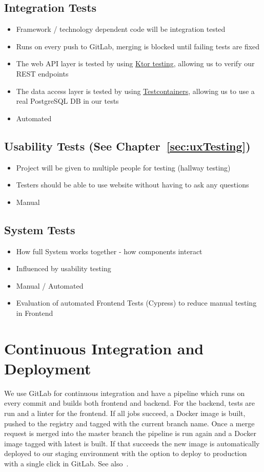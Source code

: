 \subsection{Integration Tests}
\begin{itemize}
    \item Framework / technology dependent code will be integration tested
    \item Runs on every push to GitLab, merging is blocked until failing tests are fixed
    \item The web API layer is tested by using \hyperlink{https://ktor.io/docs/testing.html}{Ktor testing}, allowing us to verify our REST endpoints
    \item The data access layer is tested by using \hyperlink{https://www.testcontainers.org/}{Testcontainers}, allowing us to use a real PostgreSQL DB in our tests
    \item Automated
\end{itemize}

\subsection{Usability Tests (See Chapter~\ref{sec:uxTesting})}
\begin{itemize}
    \item Project will be given to multiple people for testing (hallway testing)
    \item Testers should be able to use website without having to ask any questions
    \item Manual
\end{itemize}

\subsection{System Tests}
\begin{itemize}
    \item How full System works together - how components interact
    \item Influenced by usability testing
    \item Manual / Automated
    \item Evaluation of automated Frontend Tests (Cypress) to reduce manual testing in Frontend
\end{itemize}

\section{Continuous Integration and Deployment}
We use GitLab for continuous integration and have a pipeline which runs on every commit and builds both frontend and backend.
For the backend, tests are run and a linter for the frontend.
If all jobs succeed, a Docker image is built, pushed to the registry and tagged with the current branch name.
Once a merge request is merged into the master branch the pipeline is run again and a Docker image tagged with latest is built.
If that succeeds the new image is automatically deployed to our staging environment with the option to deploy to production with a single click in GitLab.
See also~.

